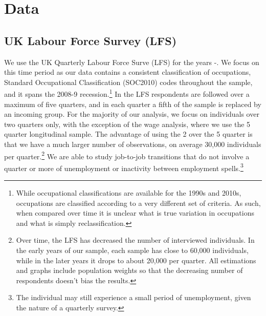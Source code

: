 \documentclass[11pt, oneside]{article}
\begin{document}
	
	\section{Data}
	\label{sec:Data}
	
	\subsection{UK Labour Force Survey (LFS)}
	
	We use the UK Quarterly Labour Force Surve (LFS) for the years \hspace{-1mm}-\hspace{-1mm}. We focus on this time period as our data contains a consistent classification of occupations, Standard Occupational Classification (SOC2010) codes throughout the sample, and it spans the 2008-9 recession.\footnote{While occupational classifications are available for the 1990s and 2010s, occupations are classified according to a very different set of criteria. As such, when compared over time it is unclear what is true variation in occupations and what is simply reclassification.}  In the LFS respondents are followed over a maximum of five quarters, and in each quarter a fifth of the sample is replaced by an incoming group. For the majority of our analysis, we focus on individuals over two quarters only, with the exception of the wage analysis, where we use the 5 quarter longitudinal sample. The advantage of using the 2 over the 5 quarter is that we have a much larger number of observations, on average 30,000 individuals per quarter.\footnote{Over time, the LFS has decreased the number of interviewed individuals. In the early years of our sample, each sample has close to 60,000 individuals, while in the later years it drops to about 20,000 per quarter. All estimations and graphs include population weights so that the decreasing number of respondents doesn't bias the results.} We are able to study job-to-job transitions that do not involve a quarter or more of unemployment or inactivity between employment spells.\footnote{The individual may still experience a small period of unemployment, given the nature of a quarterly survey.} 
	
\end{document}
